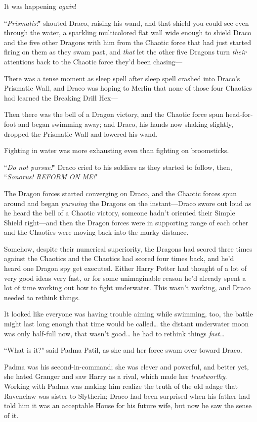 It was happening \emph{again}!

``\emph{Prismatis!}" shouted Draco, raising his wand, and that shield you could see even through the water, a sparkling multicolored flat wall wide enough to shield Draco and the five other Dragons with him from the Chaotic force that had just started firing on them as they swam past, and \emph{that} let the other five Dragons turn \emph{their} attentions back to the Chaotic force they'd been chasing—

There was a tense moment as sleep spell after sleep spell crashed into Draco's Prismatic Wall, and Draco was hoping to Merlin that none of those four Chaotics had learned the Breaking Drill Hex—

Then there was the bell of a Dragon victory, and the Chaotic force spun head-for-foot and began swimming away; and Draco, his hands now shaking slightly, dropped the Prismatic Wall and lowered his wand.

Fighting in water was more exhausting even than fighting on broomsticks.

``\emph{Do not pursue!}" Draco cried to his soldiers as they started to follow, then, ``\emph{Sonorus! REFORM ON ME!}"

The Dragon forces started converging on Draco, and the Chaotic forces spun around and began \emph{pursuing} the Dragons on the instant—Draco swore out loud as he heard the bell of a Chaotic victory, someone hadn't oriented their Simple Shield right—and then the Dragon forces were in supporting range of each other and the Chaotics were moving back into the murky distance.

Somehow, despite their numerical superiority, the Dragons had scored three times against the Chaotics and the Chaotics had scored four times back, and he'd heard one Dragon spy get executed. Either Harry Potter had thought of a lot of very good ideas very fast, or for some unimaginable reason he'd already spent a lot of time working out how to fight underwater. This wasn't working, and Draco needed to rethink things.

It looked like everyone was having trouble aiming while swimming, too, the battle might last long enough that time would be called{\ldots} the distant underwater moon was only half-full now, that wasn't good{\ldots} he had to rethink things \emph{fast{\ldots}}

``What is it?" said Padma Patil, as she and her force swam over toward Draco.

Padma was his second-in-command; she was clever and powerful, and better yet, she hated Granger and saw Harry as a rival, which made her \emph{trustworthy}. Working with Padma was making him realize the truth of the old adage that Ravenclaw was sister to Slytherin; Draco had been surprised when his father had told him it was an acceptable House for his future wife, but now he saw the sense of it.

